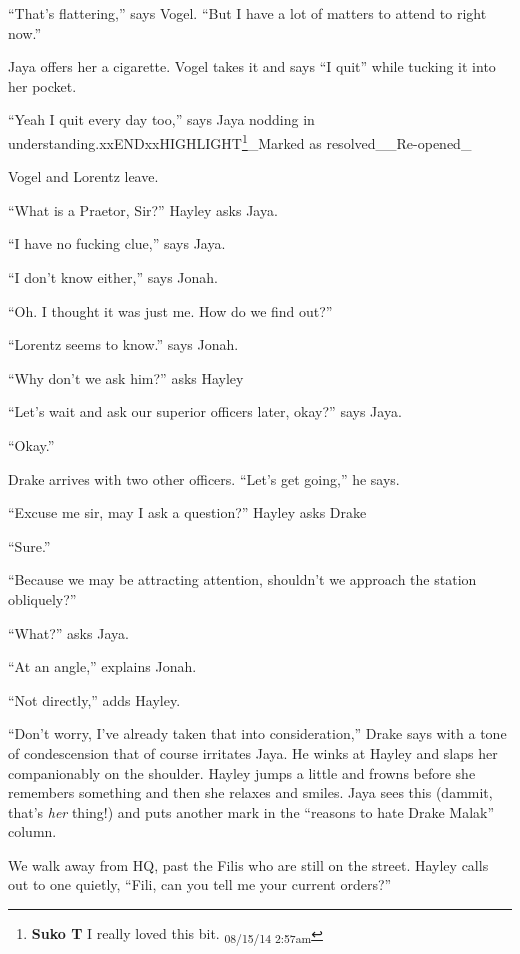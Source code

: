 ``That's flattering,'' says Vogel.  ``But I have a lot of matters to attend to right now.''  

Jaya offers her a cigarette.  Vogel takes it and says ``I quit'' while tucking it into her pocket.

``Yeah I quit every day too,'' says Jaya nodding in understanding.xxENDxxHIGHLIGHT\footnote{\textbf{Suko T }I really loved this bit. \textsubscript{08/15/14 2:57am}}\_Marked as resolved\_\_Re-opened\_

Vogel and Lorentz leave.



``What is a Praetor, Sir?'' Hayley asks Jaya.

``I have no fucking clue,'' says Jaya.

``I don't know either,'' says Jonah.

``Oh.  I thought it was just me.  How do we find out?''

``Lorentz seems to know.'' says Jonah.

``Why don't we ask him?'' asks Hayley

``Let's wait and ask our superior officers later, okay?'' says Jaya.

``Okay.''



Drake arrives with two other officers.  ``Let's get going,'' he says.

``Excuse me sir, may I ask a question?'' Hayley asks Drake

``Sure.''

``Because we may be attracting attention, shouldn't we approach the station obliquely?'' 

``What?'' asks Jaya.

``At an angle,'' explains Jonah.

``Not directly,'' adds Hayley.

``Don't worry, I've already taken that into consideration,'' Drake says with a tone of condescension that of course irritates Jaya.  He winks at Hayley and slaps her companionably on the shoulder.  Hayley jumps a little and frowns before she remembers something and then she relaxes and smiles.  Jaya sees this (dammit, that's \textit{her} thing!) and puts another mark in the ``reasons to hate Drake Malak'' column.  





We walk away from HQ, past the Filis who are still on the street.  Hayley calls out to one quietly, ``Fili, can you tell me your current orders?''

